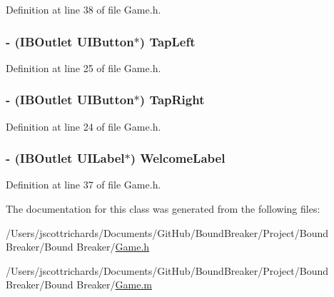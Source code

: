 Definition at line 38 of file Game.\+h.

\hypertarget{interface_game_a7f62328175e8d51677326d5790543944}{}
\subsubsection[{Tap\+Left}]{\setlength{\rightskip}{0pt plus 5cm}-\/ (I\+B\+Outlet U\+I\+Button$\ast$) Tap\+Left\hspace{0.3cm}{\ttfamily [protected]}}\label{interface_game_a7f62328175e8d51677326d5790543944}


Definition at line 25 of file Game.\+h.

\hypertarget{interface_game_abf35f63e020058662153b0ae30bbd0ee}{}
\subsubsection[{Tap\+Right}]{\setlength{\rightskip}{0pt plus 5cm}-\/ (I\+B\+Outlet U\+I\+Button$\ast$) Tap\+Right\hspace{0.3cm}{\ttfamily [protected]}}\label{interface_game_abf35f63e020058662153b0ae30bbd0ee}


Definition at line 24 of file Game.\+h.

\hypertarget{interface_game_a4f64d94a9c2c7d4647b08f4829b8e76f}{}
\subsubsection[{Welcome\+Label}]{\setlength{\rightskip}{0pt plus 5cm}-\/ (I\+B\+Outlet U\+I\+Label$\ast$) Welcome\+Label\hspace{0.3cm}{\ttfamily [protected]}}\label{interface_game_a4f64d94a9c2c7d4647b08f4829b8e76f}


Definition at line 37 of file Game.\+h.



The documentation for this class was generated from the following files\+:\begin{DoxyCompactItemize}
\item 
/\+Users/jscottrichards/\+Documents/\+Git\+Hub/\+Bound\+Breaker/\+Project/\+Bound Breaker/\+Bound Breaker/\hyperlink{_game_8h}{Game.\+h}\item 
/\+Users/jscottrichards/\+Documents/\+Git\+Hub/\+Bound\+Breaker/\+Project/\+Bound Breaker/\+Bound Breaker/\hyperlink{_game_8m}{Game.\+m}\end{DoxyCompactItemize}
